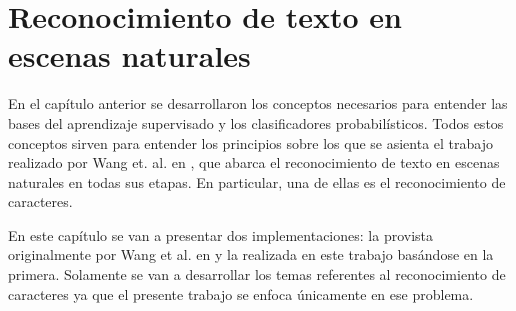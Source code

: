 \newpage	
\section{Reconocimiento de texto en escenas naturales}

	En el capítulo anterior se desarrollaron los conceptos necesarios para entender las bases del aprendizaje supervisado y los clasificadores probabilísticos. Todos estos conceptos sirven para entender los principios sobre los que se asienta el trabajo realizado por Wang et. al. en \cite{wang}, que abarca el reconocimiento de texto en escenas naturales en todas sus etapas. En particular, una de ellas es el reconocimiento de caracteres.
	
	En este capítulo se van a presentar dos implementaciones: la provista originalmente por Wang et al. en \cite{wang} y la realizada en este trabajo basándose en la primera. Solamente se van a desarrollar los temas referentes al reconocimiento de caracteres ya que el presente trabajo se enfoca únicamente en ese problema.
	
	
		
	
	
	
	
	
	
